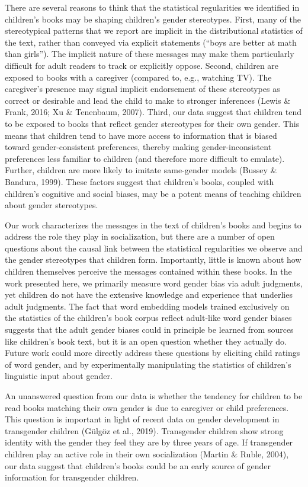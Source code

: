 \documentclass[english,,man,floatsintext]{apa6}
\begin{document}
There are several reasons to think that the statistical regularities we identified in children's books may be shaping children's gender stereotypes. First, many of the stereotypical patterns that we report are implicit in the distributional statistics of the text, rather than conveyed via explicit statements (\enquote{boys are better at math than girls}). The implicit nature of these messages may make them particularly difficult for adult readers to track or explicitly oppose. Second, children are exposed to books with a caregiver (compared to, e.g., watching TV). The caregiver's presence may signal implicit endorsement of these stereotypes as correct or desirable and lead the child to make to stronger inferences (Lewis \& Frank, 2016; Xu \& Tenenbaum, 2007). Third, our data suggest that children tend to be exposed to books that reflect gender stereotypes for their own gender. This means that children tend to have more access to information that is biased toward gender-consistent preferences, thereby making gender-inconsistent preferences less familiar to children (and therefore more difficult to emulate). Further, children are more likely to imitate same-gender models (Bussey \& Bandura, 1999). These factors suggest that children's books, coupled with children's cognitive and social biases, may be a potent means of teaching children about gender stereotypes.

Our work characterizes the messages in the text of children's books and begins to address the role they play in socialization, but there are a number of open questions about the causal link between the statistical regularities we observe and the gender stereotypes that children form. Importantly, little is known about how children themselves perceive the messages contained within these books. In the work presented here, we primarily measure word gender bias via adult judgments, yet children do not have the extensive knowledge and experience that underlies adult judgments. The fact that word embedding models trained exclusively on the statistics of the children's book corpus reflect adult-like word gender biases suggests that the adult gender biases could in principle be learned from sources like children's book text, but it is an open question whether they actually do. Future work could more directly address these questions by eliciting child ratings of word gender, and by experimentally manipulating the statistics of children's linguistic input about gender.

An unanswered question from our data is whether the tendency for children to be read books matching their own gender is due to caregiver or child preferences. This question is important in light of recent data on gender development in transgender children (Gülgöz et al., 2019). Transgender children show strong identity with the gender they feel they are by three years of age. If transgender children play an active role in their own socialization (Martin \& Ruble, 2004), our data suggest that children's books could be an early source of gender information for transgender children.
\end{document}
